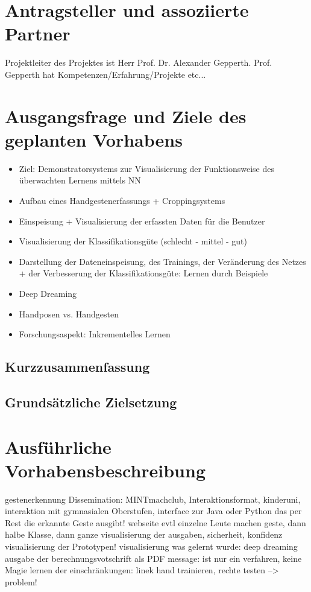 \documentclass{article}
\begin{document}
\renewcommand{\thesection}{2}
\section{Antragsteller und assoziierte Partner}
Projektleiter des Projektes ist Herr Prof. Dr. Alexander Gepperth. Prof. Gepperth hat Kompetenzen/Erfahrung/Projekte etc...

\renewcommand{\thesection}{3}
\section{Ausgangsfrage und Ziele des geplanten Vorhabens}

\begin{itemize}
	\item Ziel: Demonstratorsystems zur Visualisierung der Funktionsweise des überwachten Lernens mittels NN
	\item Aufbau eines Handgestenerfassungs + Croppingsystems
	\item Einspeisung + Visualisierung der erfassten Daten für die Benutzer
	\item Visualisierung der Klassifikationsgüte (schlecht - mittel - gut)
	\item Darstellung der Dateneinspeisung, des Trainings, der Veränderung des Netzes + der Verbesserung der Klassifikationsgüte: Lernen durch Beispiele
	\item Deep Dreaming
	\item Handposen vs. Handgesten
	\item Forschungsaspekt: Inkrementelles Lernen

\end{itemize}


\subsection{Kurzzusammenfassung}
\subsection{Grundsätzliche Zielsetzung}
%
\renewcommand{\thesection}{4}
\section{Ausführliche Vorhabensbeschreibung}
gestenerkennung
Dissemination: MINTmachclub, Interaktionsformat, kinderuni,
interaktion mit gymnasialen Oberstufen, interface zur Java oder Python das per Rest die erkannte Geste ausgibt!
webseite
evtl einzelne Leute machen geste, dann halbe Klasse, dann ganze
visualisierung der ausgaben, sicherheit, konfidenz
visualisierung der Prototypen!
visualisierung was gelernt wurde: deep dreaming
ausgabe der berechnungsvotschrift als PDF
message: ist nur ein verfahren, keine Magie
lernen der einschränkungen: linek hand trainieren, rechte testen --> problem!
\end{document}
